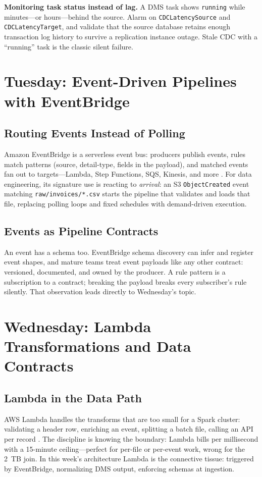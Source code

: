 \begin{pitfall}
\textbf{Monitoring task status instead of lag.} A DMS task shows \texttt{running} while minutes---or hours---behind the source. Alarm on \texttt{CDCLatencySource} and \texttt{CDCLatencyTarget}, and validate that the source database retains enough transaction log history to survive a replication instance outage. Stale CDC with a ``running'' task is the classic silent failure.
\end{pitfall}

\section{Tuesday: Event-Driven Pipelines with EventBridge}
\subsection{Routing Events Instead of Polling}
Amazon EventBridge is a serverless event bus: producers publish events, rules match patterns (source, detail-type, fields in the payload), and matched events fan out to targets---Lambda, Step Functions, SQS, Kinesis, and more \cite{awsEventBridgeDocs}. For data engineering, its signature use is reacting to \emph{arrival}: an S3 \texttt{ObjectCreated} event matching \texttt{raw/invoices/*.csv} starts the pipeline that validates and loads that file, replacing polling loops and fixed schedules with demand-driven execution.

\subsection{Events as Pipeline Contracts}
An event has a schema too. EventBridge schema discovery can infer and register event shapes, and mature teams treat event payloads like any other contract: versioned, documented, and owned by the producer. A rule pattern is a subscription to a contract; breaking the payload breaks every subscriber's rule silently. That observation leads directly to Wednesday's topic.

\section{Wednesday: Lambda Transformations and Data Contracts}
\subsection{Lambda in the Data Path}
AWS Lambda handles the transforms that are too small for a Spark cluster: validating a header row, enriching an event, splitting a batch file, calling an API per record \cite{awsLambdaDocs}. The discipline is knowing the boundary: Lambda bills per millisecond with a 15-minute ceiling---perfect for per-file or per-event work, wrong for the 2~TB join. In this week's architecture Lambda is the connective tissue: triggered by EventBridge, normalizing DMS output, enforcing schemas at ingestion.

